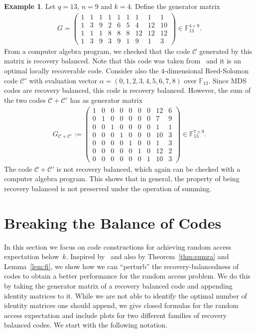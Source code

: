 \documentclass[11pt,a4paper,reqno,twoside]{amsart}
\theoremstyle{definition}
\newtheorem{example}{Example}
\newcommand{\F}{\mathbb{F}}
\newcommand{\mC}{\mathcal{C}}
\begin{document}
\begin{example} \label{ex:summi}
Let $q=13$, $n=9$ and $k=4$. Define the generator matrix 
\begin{align*}
    G= \begin{pmatrix}
        1 & 1 & 1 & 1 & 1 & 1 & 1 & 1 & 1 \\
        1 & 3 & 9 & 2 & 6 & 5 & 4 & 12 & 10 \\ 
        1 & 1 & 1 & 8 & 8 & 8 & 12 & 12 & 12 \\
        1 & 3 & 9 & 3 & 9 & 1 & 9 & 1 & 3
    \end{pmatrix} \in \F_{13}^{4 \times 9}.
\end{align*}
From a computer algebra program, we checked that the code $\mC$ generated by this matrix is recovery balanced. Note that this code was taken from~\cite[Example 1]{tamo2014family} and it is an optimal locally recoverable code.
Consider also the $4$-dimensional Reed-Solomon code $\mC'$ with evaluation vector $\alpha=(0,1,2,3,4,5,6,7,8)$ over $\F_{13}$. Since MDS codes are recovery balanced, this code is recovery balanced.
However, the sum of the two codes $\mC+\mC'$ has as generator matrix 
\begin{align*}
G_{\mC+\mC'}:= \begin{pmatrix}
 1 & 0 & 0 & 0 & 0 & 0 & 0 & 12 & 6 \\
 0 & 1 & 0 & 0 & 0 & 0 & 0 & 7 & 9 \\
 0 & 0 & 1 & 0 & 0 & 0 & 0 & 1 & 1 \\
 0 & 0 & 0 & 1 & 0 & 0 & 0 & 10 & 3 \\
 0 & 0 & 0 & 0 & 1 & 0 & 0 & 1 & 3 \\
 0 & 0 & 0 & 0 & 0 & 1 & 0 & 12 & 2 \\
 0 & 0 & 0 & 0 & 0 & 0 & 1 & 10 & 3
\end{pmatrix} \in \F_{13}^{7 \times 9}.
\end{align*}
The code $\mC+\mC'$ is not recovery balanced, which again can be checked with a computer algebra program. This shows that in general, the property of being recovery balanced is not preserved under the operation of summing.
\end{example}


\section{Breaking the Balance of Codes}\label{sec:break}

In this section we focus on code constructions for achieving random access expectation below~$k$. 
Inspired by~\cite[Construction 2]{bar2023cover} and also by Theorem~\ref{thm:sumra} and Lemma~\ref{lem:fi}, we show how we can ``perturb''
the recovery-balancedness of codes to obtain a better performance for the random access problem.
We do this by taking the generator matrix of a recovery balanced code and appending identity matrices to it. While we are not able to identify the optimal number of identity matrices one should append, we give closed formulas for the random access expectation and include plots for two different families of recovery balanced codes. 
We start with the following notation.
\end{document}
